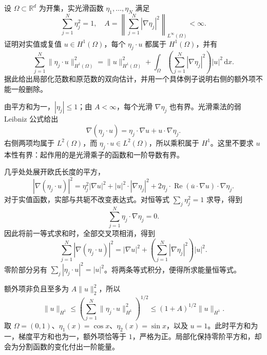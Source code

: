 \begin{exercise}\label{b1:ex:22-quadratic-localization}
设 \(\Omega\subset\mathbb R^d\) 为开集，实光滑函数 \(\eta_1,\ldots,\eta_N\) 满足
\[
 \sum_{j=1}^N\eta_j^2=1,\quad
 A=\left\|\sum_{j=1}^N|\nabla\eta_j|^2\right\|_{L^\infty(\Omega)}<\infty.
\]
证明对实值或复值 \(u\in H^1(\Omega)\)，每个 \(\eta_j\cdot u\) 都属于 \(H^1(\Omega)\)，并有
\[
 \sum_{j=1}^N\|\eta_j\cdot u\|_{H^1(\Omega)}^2
 =\|u\|_{H^1(\Omega)}^2
   +\int_\Omega\left(\sum_{j=1}^N|\nabla\eta_j|^2\right)|u|^2\,\mathrm dx.
\]
据此给出局部化范数和原范数的双向估计，并用一个具体例子说明右侧的额外项不能一般删除。
\end{exercise}
\begin{solution}
由平方和为一，\(|\eta_j|\le1\)；由 \(A<\infty\)，每个光滑 \(\nabla\eta_j\) 也有界。光滑乘法的弱 Leibniz 公式给出
\[
 \nabla(\eta_j\cdot u)=\eta_j\cdot\nabla u+u\cdot\nabla\eta_j.
\]
右侧两项均属于 \(L^2(\Omega)\)，而 \(\eta_j\cdot u\in L^2(\Omega)\)，所以乘积属于 \(H^1\)。这里不要求 \(u\) 本性有界：起作用的是光滑乘子的函数和一阶导数有界。

几乎处处展开欧氏长度的平方，
\[
 |\nabla(\eta_j\cdot u)|^2
 =\eta_j^2|\nabla u|^2+|u|^2\cdot|\nabla\eta_j|^2
   +2\eta_j\cdot\operatorname{Re}(\overline u\cdot\nabla u)\cdot\nabla\eta_j.
\]
对于实值函数，实部与共轭不改变表达式。对恒等式 \(\sum_j\eta_j^2=1\) 求导，得到
\[
 \sum_{j=1}^N\eta_j\cdot\nabla\eta_j=0.
\]
因此将前一等式求和时，全部交叉项相消，得到
\[
 \sum_{j=1}^N|\nabla(\eta_j\cdot u)|^2
 =|\nabla u|^2+\left(\sum_{j=1}^N|\nabla\eta_j|^2\right)|u|^2.
\]
零阶部分另有 \(\sum_j|\eta_j\cdot u|^2=|u|^2\)。将两条等式积分，便得所求能量恒等式。

额外项非负且至多为 \(A\|u\|_2^2\)，所以
\[
 \|u\|_{H^1}
 \le\left(\sum_{j=1}^N\|\eta_j\cdot u\|_{H^1}^2\right)^{1/2}
 \le(1+A)^{1/2}\|u\|_{H^1}.
\]
取 \(\Omega=(0,1)\)、\(\eta_1(x)=\cos x\)、\(\eta_2(x)=\sin x\)，以及 \(u=1\)。此时平方和为一，梯度平方和也为一，额外项恰等于 \(1\)，严格为正。局部化保持零阶平方和，却会为分割函数的变化付出一阶能量。
\end{solution}

